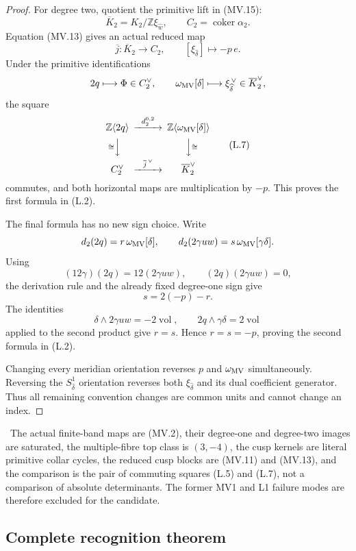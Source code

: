 \begin{proof}
For degree two, quotient the primitive lift in (MV.15):
\[
 \overline K_2=K_2/\mathbb Z\xi_{\widehat w},
 \qquad C_2=\operatorname{coker}\alpha_2.
\]
Equation (MV.13) gives an actual reduced map
\[
 \overline j:\overline K_2\longrightarrow C_2,
 \qquad [\xi_{\widehat\delta}]\longmapsto -p\,e.
\tag{L.6}
\]
Under the primitive identifications
\[
 2q\longmapsto\Phi\in C_2^\vee,
 \qquad
 \omega_{\rm MV}[\delta]\longmapsto
 \xi_{\widehat\delta}^{\,\vee}\in\overline K_2^\vee,
\]
the square
\[
\begin{CD}
\mathbb Z\langle2q\rangle
@>{d_2^{0,2}}>>
\mathbb Z\langle\omega_{\rm MV}[\delta]\rangle\\
@V{\cong}VV @VV{\cong}V\\
C_2^\vee @>{\overline j^{\,\vee}}>> \overline K_2^\vee
\end{CD}
\tag{L.7}
\]
commutes, and both horizontal maps are multiplication by $-p$.  This proves
the first formula in (L.2).

The final formula has no new sign choice.  Write
\[
 d_2(2q)=r\,\omega_{\rm MV}[\delta],
 \qquad
 d_2(2\gamma uw)=s\,\omega_{\rm MV}[\gamma\delta].
\]
Using
\[
 (12\gamma)(2q)=12(2\gamma uw),
 \qquad (2q)(2\gamma uw)=0,
\]
the derivation rule and the already fixed degree-one sign give
\[
 s=2(-p)-r.
\]
The identities
\[
 \delta\wedge2\gamma uw=-2\operatorname{vol},
 \qquad
 2q\wedge\gamma\delta=2\operatorname{vol}
\]
applied to the second product give $r=s$.  Hence $r=s=-p$, proving the
second formula in (L.2).

Changing every meridian orientation reverses $p$ and
$\omega_{\rm MV}$ simultaneously.  Reversing the
$S^1_{\widehat\delta}$ orientation reverses both
$\xi_{\widehat\delta}$ and its dual coefficient generator.  Thus all
remaining convention changes are common units and cannot change an index.
\end{proof}

\begin{test}
\Verified\ The actual finite-band maps are (MV.2), their degree-one and
degree-two images are saturated, the multiple-fibre top class is
$(3,-4)$, the cusp kernels are literal primitive collar cycles, the reduced
cusp blocks are (MV.11) and (MV.13), and the comparison is the pair of
commuting squares (L.5) and (L.7), not a comparison of absolute determinants.
The former MV1 and L1 failure modes are therefore excluded for the candidate.
\end{test}

\subsection{Complete recognition theorem}

